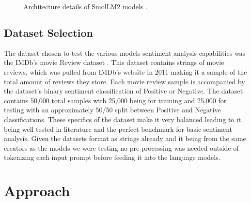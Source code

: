 \documentclass[10pt,twocolumn,letterpaper]{article}
\begin{document}
\begin{figure}[t]
\begin{center}
\end{center}
   \caption{Architecture details of SmolLM2 models \cite{hf-SmolLM2-usecase}.}
\label{fig:SmolLM2-parameteres}
\end{figure}


\subsection{Dataset Selection}
The dataset chosen to test the various models sentiment analysis capabilities was the IMDb's movie Review dataset \cite{IMDB-dataset}. This dataset contains strings of movie reviews, which was pulled from IMDb's website in 2011 making it a sample of the total amount of reviews they store. Each movie review sample is accompanied by the dataset's binary sentiment classification of Positive or Negative. The dataset contains 50,000 total samples with 25,000 being for training and 25,000 for testing with an approximately 50/50 split between Positive and Negative classifications. These specifics of the dataset make it very balanced leading to it being well tested in literature and the perfect benchmark for basic sentiment analysis. Given the datasets format as strings already and it being from the same creators as the models we were testing no pre-processing was needed outside of tokenizing each input prompt before feeding it into the language models. 




\section{Approach}

\end{document}
